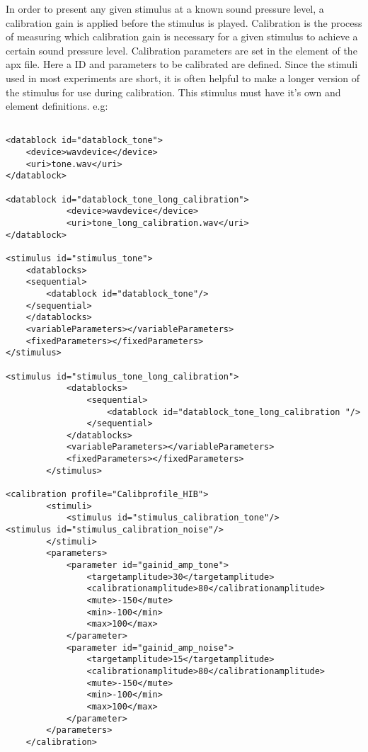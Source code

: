 In order to present any given stimulus at a known sound pressure level, a calibration gain is applied before the stimulus is played. Calibration is the process of measuring which calibration gain is necessary for a given stimulus to achieve a certain sound pressure level.
Calibration parameters are set in the element of the apx file. Here a  ID and parameters to be calibrated are defined. Since the stimuli used in most experiments are short, it is often helpful to make a longer version of the stimulus for use during calibration. This stimulus must have it’s own  and  element definitions.
e.g: 


\begin{lstlisting}

<datablock id="datablock_tone">
	<device>wavdevice</device>
	<uri>tone.wav</uri>
</datablock>

<datablock id="datablock_tone_long_calibration">
            <device>wavdevice</device>
            <uri>tone_long_calibration.wav</uri>
</datablock>

<stimulus id="stimulus_tone">
	<datablocks>
	<sequential>
		<datablock id="datablock_tone"/>
	</sequential>
	</datablocks>
	<variableParameters></variableParameters>
	<fixedParameters></fixedParameters>
</stimulus>

<stimulus id="stimulus_tone_long_calibration">
            <datablocks>
                <sequential>
                    <datablock id="datablock_tone_long_calibration "/>
                </sequential>
            </datablocks>
            <variableParameters></variableParameters>
            <fixedParameters></fixedParameters>
        </stimulus>

<calibration profile="Calibprofile_HIB">
        <stimuli>
            <stimulus id="stimulus_calibration_tone"/>
<stimulus id="stimulus_calibration_noise"/>
        </stimuli>
        <parameters>
            <parameter id="gainid_amp_tone">
                <targetamplitude>30</targetamplitude>
                <calibrationamplitude>80</calibrationamplitude>
                <mute>-150</mute>
                <min>-100</min>
                <max>100</max>
            </parameter>
            <parameter id="gainid_amp_noise">
                <targetamplitude>15</targetamplitude>
                <calibrationamplitude>80</calibrationamplitude>
                <mute>-150</mute>
                <min>-100</min>
                <max>100</max>
            </parameter>
        </parameters>
    </calibration>

\end{lstlisting}

